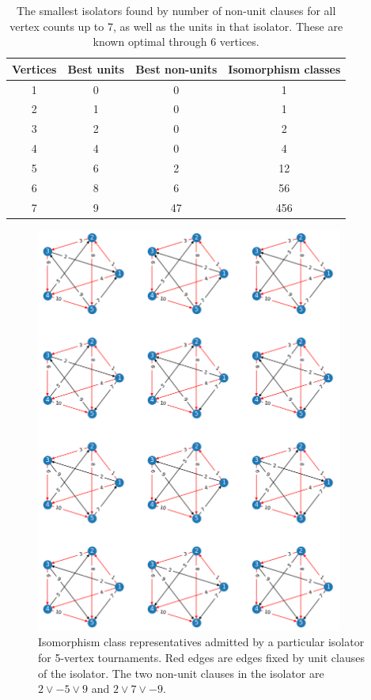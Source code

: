 \documentclass[a4paper,UKenglish,cleveref, autoref, thm-restate]{lipics-v2021}
\begin{document}
\begin{table}[ht]
    \centering
    \begin{tabular}{c|c|c|c}
        Vertices &Best units & Best non-units & Isomorphism classes \\ \hline
        1&0&0&1\\ 
        2&1&0&1\\ 
        3&2&0&2\\ 
        4&4&0&4\\
        5&6&2&12\\ 
        6&8&6&56\\ 
        7&9&47&456\\ 
    \end{tabular}
    \caption{The smallest isolators found by number of non-unit clauses for all vertex counts up to 7, as well as the units in that isolator.  These are known optimal through 6 vertices.}
    \label{tab:smallest_isolators_found}
\end{table}

\begin{figure}
\includegraphics[width=0.9\textwidth]{iso_5.png}
\caption{Isomorphism class representatives admitted by a particular isolator for 5-vertex tournaments. Red edges are edges fixed by unit clauses of the isolator. The two non-unit clauses in the isolator are $2 \lor -5 \lor 9$ and $2 \lor 7 \lor -9$.} \label{fig2}
\end{figure}
\end{document}
